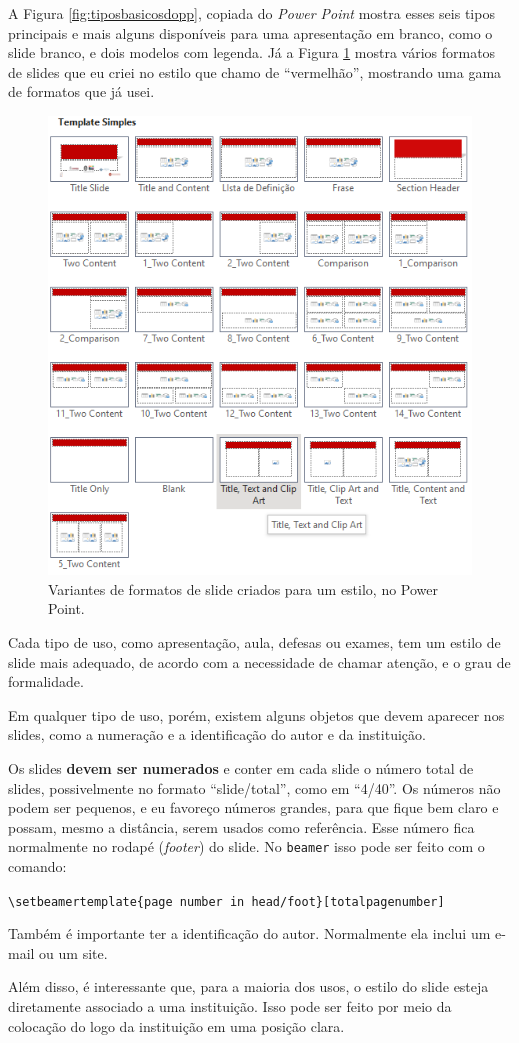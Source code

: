 A Figura \ref{fig:tiposbasicosdopp}, copiada do \textit{Power Point} mostra esses seis tipos principais e mais alguns disponíveis para uma apresentação em branco, como o slide branco, e dois modelos com legenda. Já a Figura \ref{fig:vermelhao} mostra vários formatos de slides que eu criei no estilo que chamo de ``vermelhão'', mostrando uma gama de formatos que já usei.

\begin{figure}[hbt]
    \centering
    \includegraphics[width=0.5\linewidth]{imagens/vermelhao}
    \caption{Variantes de formatos de slide criados para um estilo, no Power Point.}
    \label{fig:vermelhao}
\end{figure}


Cada tipo de uso, como apresentação, aula, defesas ou exames, tem um estilo de slide mais adequado, de acordo com a necessidade de chamar atenção, e o grau de formalidade.

Em qualquer tipo de uso, porém, existem alguns objetos que devem aparecer nos slides, como a numeração e a identificação do autor e da instituição.

Os slides \textbf{devem ser numerados} e conter em cada slide o número total de slides, possivelmente no formato ``slide/total'', como em ``4/40''. Os números não podem ser pequenos, e eu favoreço números grandes, para que fique bem claro e possam, mesmo a distância, serem usados como referência. Esse número fica normalmente no rodapé (\textit{footer}) do slide. No \texttt{beamer} isso pode ser feito com o comando:

\verb|\setbeamertemplate{page number in head/foot}[totalpagenumber]|


Também é importante ter a identificação do autor. Normalmente ela inclui um e-mail ou um site.

Além disso, é interessante que, para a maioria dos usos, o estilo do slide esteja diretamente associado a uma instituição.
 Isso pode ser feito por meio da colocação do logo da instituição em uma posição clara.

